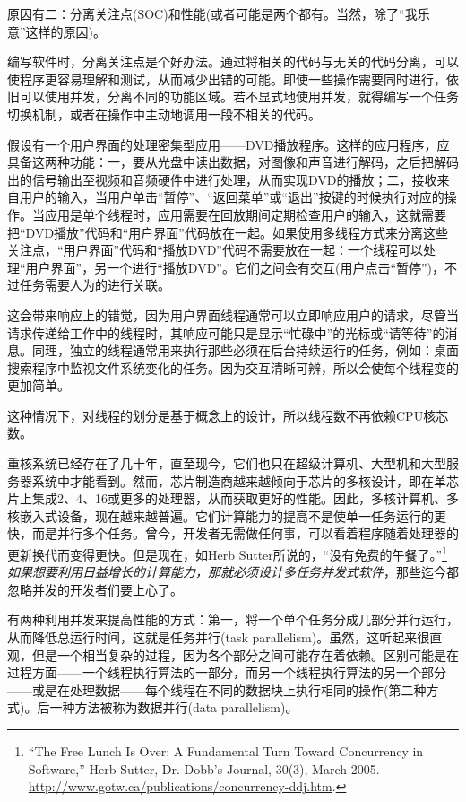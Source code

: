 原因有二：分离关注点(SOC)和性能(或者可能是两个都有。当然，除了“我乐意”这样的原因)。


编写软件时，分离关注点是个好办法。通过将相关的代码与无关的代码分离，可以使程序更容易理解和测试，从而减少出错的可能。即使一些操作需要同时进行，依旧可以使用并发，分离不同的功能区域。若不显式地使用并发，就得编写一个任务切换机制，或者在操作中主动地调用一段不相关的代码。

假设有一个用户界面的处理密集型应用——DVD播放程序。这样的应用程序，应具备这两种功能：一，要从光盘中读出数据，对图像和声音进行解码，之后把解码出的信号输出至视频和音频硬件中进行处理，从而实现DVD的播放；二，接收来自用户的输入，当用户单击“暂停”、“返回菜单”或“退出”按键的时候执行对应的操作。当应用是单个线程时，应用需要在回放期间定期检查用户的输入，这就需要把“DVD播放”代码和“用户界面”代码放在一起。如果使用多线程方式来分离这些关注点，“用户界面”代码和“播放DVD”代码不需要放在一起：一个线程可以处理“用户界面”，另一个进行“播放DVD”。它们之间会有交互(用户点击“暂停”)，不过任务需要人为的进行关联。

这会带来响应上的错觉，因为用户界面线程通常可以立即响应用户的请求，尽管当请求传递给工作中的线程时，其响应可能只是显示“忙碌中”的光标或“请等待”的消息。同理，独立的线程通常用来执行那些必须在后台持续运行的任务，例如：桌面搜索程序中监视文件系统变化的任务。因为交互清晰可辨，所以会使每个线程变的更加简单。

这种情况下，对线程的划分是基于概念上的设计，所以线程数不再依赖CPU核芯数。


重核系统已经存在了几十年，直至现今，它们也只在超级计算机、大型机和大型服务器系统中才能看到。然而，芯片制造商越来越倾向于芯片的多核设计，即在单芯片上集成2、4、16或更多的处理器，从而获取更好的性能。因此，多核计算机、多核嵌入式设备，现在越来越普遍。它们计算能力的提高不是使单一任务运行的更快，而是并行多个任务。曾今，开发者无需做任何事，可以看着程序随着处理器的更新换代而变得更快。但是现在，如Herb Sutter所说的，“没有免费的午餐了。”\footnote[1]{“The Free Lunch Is Over: A Fundamental Turn Toward Concurrency in Software,” Herb Sutter, Dr. Dobb’s Journal, 30(3), March 2005. \url{http://www.gotw.ca/publications/concurrency-ddj.htm}.} \textit{如果想要利用日益增长的计算能力，那就必须设计多任务并发式软件}，那些迄今都忽略并发的开发者们要上心了。

有两种利用并发来提高性能的方式：第一，将一个单个任务分成几部分并行运行，从而降低总运行时间，这就是任务并行(task parallelism)。虽然，这听起来很直观，但是一个相当复杂的过程，因为各个部分之间可能存在着依赖。区别可能是在过程方面——一个线程执行算法的一部分，而另一个线程执行算法的另一个部分——或是在处理数据——每个线程在不同的数据块上执行相同的操作(第二种方式)。后一种方法被称为数据并行(data parallelism)。

